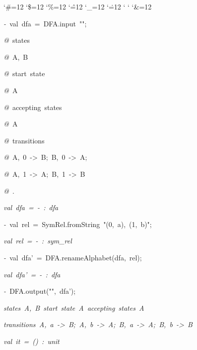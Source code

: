 \begin{list}{}
{\setlength{\leftmargin}{\leftmargini}
\setlength{\rightmargin}{0cm}
\setlength{\itemindent}{0cm}
\setlength{\listparindent}{0cm}
\setlength{\itemsep}{0cm}
\setlength{\parsep}{0cm}
\setlength{\labelsep}{0cm}
\setlength{\labelwidth}{0cm}
\catcode`\#=12
\catcode`\$=12
\catcode`\%=12
\catcode`\^=12
\catcode`\_=12
\catcode`\.=12
\catcode`
\catcode`
\catcode`\&=12
\ttfamily}
\small
\item[]\textsl{-\ }val\ dfa\ =\ DFA.input\ "";
\item[]\textsl{@\ }states
\item[]\textsl{@\ }A,\ B
\item[]\textsl{@\ }start\ state
\item[]\textsl{@\ }A
\item[]\textsl{@\ }accepting\ states
\item[]\textsl{@\ }A
\item[]\textsl{@\ }transitions
\item[]\textsl{@\ }A,\ 0\ ->\ B;\ B,\ 0\ ->\ A;
\item[]\textsl{@\ }A,\ 1\ ->\ A;\ B,\ 1\ ->\ B
\item[]\textsl{@\ }.
\item[]\textsl{val\ dfa\ =\ -\ :\ dfa}
\item[]\textsl{-\ }val\ rel\ =\ SymRel.fromString\ "(0,\ a),\ (1,\ b)";
\item[]\textsl{val\ rel\ =\ -\ :\ sym_rel}
\item[]\textsl{-\ }val\ dfa'\ =\ DFA.renameAlphabet(dfa,\ rel);
\item[]\textsl{val\ dfa'\ =\ -\ :\ dfa}
\item[]\textsl{-\ }DFA.output("",\ dfa');
\item[]\textsl{states\ A,\ B\ start\ state\ A\ accepting\ states\ A}
\item[]\textsl{transitions\ A,\ a\ ->\ B;\ A,\ b\ ->\ A;\ B,\ a\ ->\ A;\ B,\ b\ ->\ B}
\item[]\textsl{val\ it\ =\ ()\ :\ unit}
\end{list}
